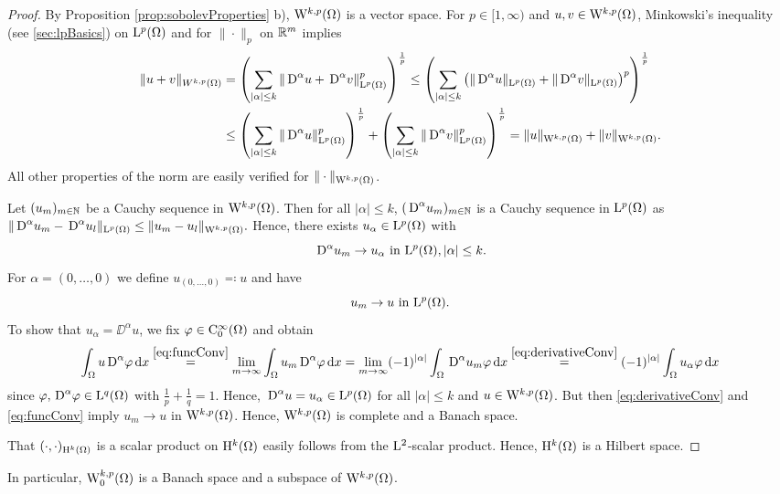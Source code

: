\begin{proof}
  By Proposition \ref{prop:sobolevProperties} b), $\mathrm{W}^{k,p}(\Omega)$ is a vector space.
  For $p \in [1,\infty)$ and $u,v \in \mathrm{W}^{k,p}(\Omega)$, Minkowski's inequality (see \ref{sec:lpBasics}) on $\mathrm{L}^p(\Omega)$ and for $\|\cdot\|_p$ on $\mathbb{R}^m$ implies
    \begin{align*}
      \|u + v\|_{W^{k,p}(\Omega)}
      &= \left( \sum_{|\alpha| \leq k} \|\,{\operatorname{D}}^\alpha u + \,{\operatorname{D}}^\alpha v\|^p_{\mathrm{L}^p(\Omega)} \right)^{\frac{1}{p}} 
      \leq \left( \sum_{|\alpha|\leq k} \left( \|\,{\operatorname{D}}^\alpha u\|_{\mathrm{L}^p(\Omega)} + \|\,{\operatorname{D}}^\alpha v\|_{\mathrm{L}^p(\Omega)} \right)^p \right)^{\frac{1}{p}} \\
      &\leq \left( \sum_{|\alpha| \leq k} \|\,{\operatorname{D}}^\alpha u\|_{\mathrm{L}^p(\Omega)}^p\right)^{\frac{1}{p}}
      + \left( \sum_{|\alpha| \leq k} \|\,{\operatorname{D}}^\alpha v\|_{\mathrm{L}^p(\Omega)}^p\right)^{\frac{1}{p}}
      = \|u\|_{\mathrm{W}^{k,p}(\Omega)} + \|v\|_{\mathrm{W}^{k,p}(\Omega)}.
    \end{align*}
    All other properties of the norm are easily verified for $\|\cdot\|_{\mathrm{W}^{k,p}(\Omega)}$.

    Let $(u_m)_{m \in \mathbb{N}}$ be a Cauchy sequence in $\mathrm{W}^{k,p}(\Omega)$.
    Then for all $|\alpha|\leq k$, $(\,{\operatorname{D}}^\alpha u_m)_{m \in \mathbb{N}}$ is a Cauchy sequence in $\mathrm{L}^p(\Omega)$ as 
    $
    \|\,{\operatorname{D}}^\alpha u_m - \,{\operatorname{D}}^\alpha u_l \|_{\mathrm{L}^p(\Omega)} \leq \|u_m - u_l \|_{\mathrm{W}^{k,p}(\Omega)}.
    $
    Hence, there exists $u_\alpha \in \mathrm{L}^p(\Omega)$ with
    \begin{equation}
      \label{eq:derivativeConv}
      \,{\operatorname{D}}^\alpha u_m \to u_\alpha \text{ in } \mathrm{L}^p(\Omega), |\alpha| \leq k.
    \end{equation}
    For $\alpha = (0,\dots,0)$ we define $u_{(0,\dots,0)}  \eqqcolon u$ and have
    \begin{equation}
      \label{eq:funcConv}
      u_m \to u \text{ in } \mathrm{L}^p(\Omega).
    \end{equation}
    To show that $u_\alpha = \DD^\alpha u$, we fix $\varphi \in \mathrm{C}_0^\infty(\Omega)$ and obtain
    \begin{align*}
      \int_\Omega u \,{\operatorname{D}}^\alpha \varphi \, {\operatorname{d}\!{x}}
      \overset{\eqref{eq:funcConv}}{=} \lim_{m \to \infty} \int_\Omega u_m \,{\operatorname{D}}^\alpha \varphi \, {\operatorname{d}\!{x}} 
      = \lim_{m \to \infty} (-1)^{|\alpha|} \int_\Omega \,{\operatorname{D}}^\alpha u_m \varphi \, {\operatorname{d}\!{x}} 
      \overset{\eqref{eq:derivativeConv}}{=} (-1)^{|\alpha|} \int_\Omega u_\alpha \varphi \, {\operatorname{d}\!{x}}
    \end{align*}
    since $\varphi, \,{\operatorname{D}}^\alpha \varphi \in \mathrm{L}^q(\Omega)$ with $\frac{1}{p} + \frac{1}{q} = 1$. Hence, $\,{\operatorname{D}}^\alpha u = u_\alpha \in \mathrm{L}^p(\Omega)$ for all $|\alpha| \leq k$ and $u \in \mathrm{W}^{k,p}(\Omega)$.
    But then \eqref{eq:derivativeConv} and \eqref{eq:funcConv} imply $u_m \to u$ in $\mathrm{W}^{k,p}(\Omega)$.
    Hence, $\mathrm{W}^{k,p}(\Omega)$ is complete and a Banach space.

    That $(\cdot,\cdot)_{\mathrm{H}^k(\Omega)}$ is a scalar product on $\mathrm{H}^k(\Omega)$ easily follows from the $\mathrm{L}^2$-scalar product.
    Hence, $\mathrm{H}^k(\Omega)$ is a Hilbert space.
\end{proof}

In particular, $\mathrm{W}_0^{k,p}(\Omega)$ is a Banach space and a subspace of $\mathrm{W}^{k,p}(\Omega)$.
